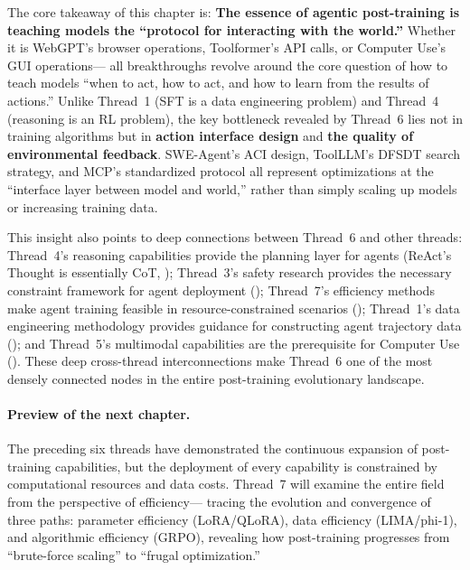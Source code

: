 \noindent
The core takeaway of this chapter is:
\textbf{The essence of agentic post-training is teaching models the ``protocol for interacting with the world.''}
Whether it is WebGPT's browser operations, Toolformer's API calls,
or Computer Use's GUI operations---
all breakthroughs revolve around the core question of how to teach models
``when to act, how to act, and how to learn from the results of actions.''
Unlike Thread~1 (SFT is a data engineering problem) and Thread~4 (reasoning is an RL problem),
the key bottleneck revealed by Thread~6 lies not in training algorithms
but in \textbf{action interface design} and \textbf{the quality of environmental feedback}.
SWE-Agent's ACI design, ToolLLM's DFSDT search strategy,
and MCP's standardized protocol
all represent optimizations at the ``interface layer between model and world,''
rather than simply scaling up models or increasing training data.

This insight also points to deep connections between Thread~6 and other threads:
Thread~4's reasoning capabilities provide the planning layer for agents
(ReAct's Thought is essentially CoT, );
Thread~3's safety research provides the necessary constraint framework for agent deployment
();
Thread~7's efficiency methods make agent training feasible in resource-constrained scenarios
();
Thread~1's data engineering methodology provides guidance for constructing agent trajectory data
();
and Thread~5's multimodal capabilities are the prerequisite for Computer Use
().
These deep cross-thread interconnections
make Thread~6 one of the most densely connected nodes in the entire post-training evolutionary landscape.

\paragraph{Preview of the next chapter.}
The preceding six threads have demonstrated the continuous expansion of post-training capabilities,
but the deployment of every capability is constrained by computational resources and data costs.
Thread~7 will examine the entire field from the perspective of efficiency---
tracing the evolution and convergence of three paths: parameter efficiency (LoRA/QLoRA), data efficiency (LIMA/phi-1), and algorithmic efficiency (GRPO),
revealing how post-training progresses from ``brute-force scaling'' to ``frugal optimization.''
